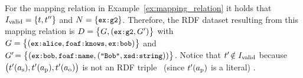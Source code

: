 \begin{example}
	\label{ex:generated_dataset}
	For the mapping relation in Example~\ref{ex:mapping_relation} it holds that $I_\mathrm{valid} = \{ t, t'' \}$ and $N = \{ \texttt{\small ex:g2} \}$. Therefore, the RDF dataset resulting from this mapping relation
	is $D = \bigl\{ G, (\texttt{\small ex:g2}, G') \bigr\}$
	with $G = \big\{ (\texttt{\small ex:alice}, \texttt{\small foaf:knows}, \texttt{\small ex:bob}) \big\}$
	and $G'\! = \big\{ (\texttt{\small ex:bob}, \texttt{\small foaf:name}, (\texttt{\small "Bob"},\texttt{\small xsd:string})) \big\}$. Notice that $t'\! \notin I_\mathrm{valid}$ because $\big( t'(a_\textrm{s}), t'(a_\textrm{p}), t'(a_\textrm{o}) \bigr)$ is not an RDF triple%
		~(since $t'(a_\textrm{p})$ is a literal)%
	.
\end{example}
